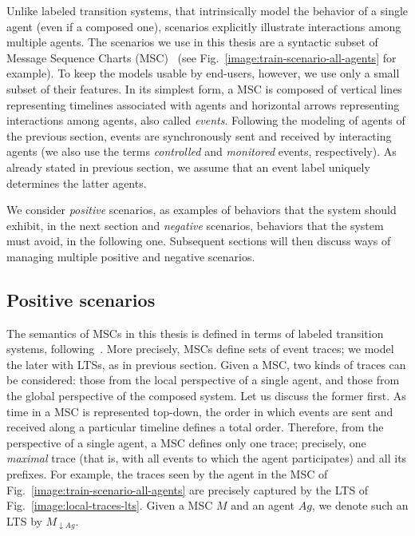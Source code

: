 Unlike labeled transition systems, that intrinsically model the behavior of a single agent (even if a composed one), scenarios explicitly illustrate interactions among multiple agents. The scenarios we use in this thesis are a syntactic subset of Message Sequence Charts (MSC)~\cite{ITU:1996} (see Fig.~\ref{image:train-scenario-all-agents} for example). To keep the models usable by end-users, however, we use only a small subset of their features. In its simplest form, a MSC is composed of vertical lines representing timelines associated with agents and horizontal arrows representing interactions among agents, also called \emph{events}. Following the modeling of agents of the previous section, events are synchronously sent and received by interacting agents (we also use the terms \emph{controlled} and \emph{monitored} events, respectively). As already stated in previous section, we assume that an event label uniquely determines the latter agents. 

We consider \emph{positive} scenarios, as examples of behaviors that the system should exhibit, in the next section and \emph{negative} scenarios, behaviors that the system must avoid, in the following one. Subsequent sections will then discuss ways of managing multiple positive and negative scenarios. 

\subsection{Positive scenarios}

The semantics of MSCs in this thesis is defined in terms of labeled transition systems, following~\cite{Uchitel:2003}. More precisely, MSCs define sets of event traces; we model the later with LTSs, as in previous section. Given a MSC, two kinds of traces can be considered: those from the local perspective of a single agent, and those from the global perspective of the composed system. Let us discuss the former first. As time in a MSC is represented top-down, the order in which events are sent and received along a particular timeline defines a total order. Therefore, from the perspective of a single agent, a MSC defines only one trace; precisely, one \emph{maximal} trace (that is, with all events to which the agent participates) and all its prefixes. For example, the traces seen by the  agent in the MSC of Fig.~\ref{image:train-scenario-all-agents} are precisely captured by the LTS of Fig.~\ref{image:local-traces-lts}. Given a MSC $M$ and an agent $Ag$, we denote such an LTS by $M_{\downarrow Ag}$.

